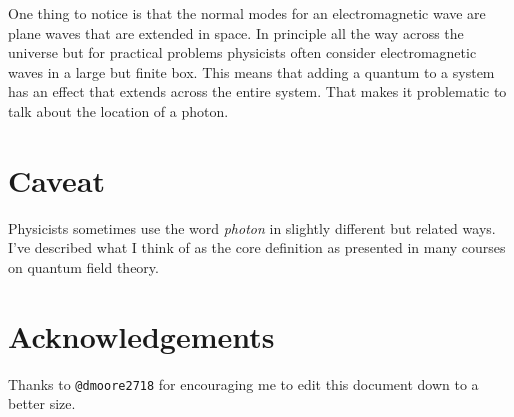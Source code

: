 \documentclass[a4paper]{article}
\begin{document}
One thing to notice is that the normal modes for an electromagnetic wave are plane waves that are extended in space.
In principle all the way across the universe but for practical problems physicists often consider electromagnetic waves in a large but finite box.
This means that adding a quantum to a system has an effect that extends across the entire system.
That makes it problematic to talk about the location of a photon.

\section{Caveat}
Physicists sometimes use the word {\em photon} in slightly different but related ways.
I've described what I think of as the core definition as presented in many courses on quantum field theory.

\section{Acknowledgements}
Thanks to \texttt{@dmoore2718} for encouraging me to edit this document down to a better size.
\end{document}
